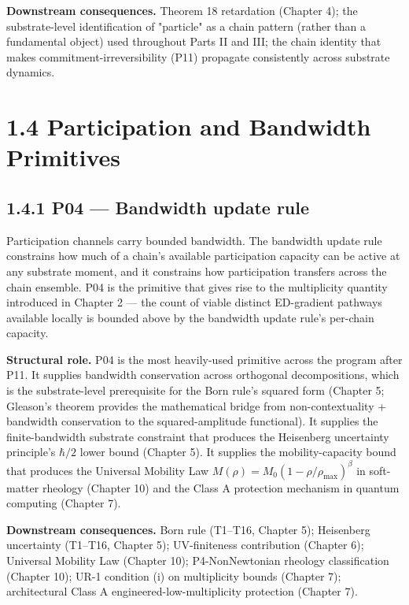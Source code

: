 \documentclass[11pt]{book}
\begin{document}
\textbf{Downstream consequences.} Theorem 18 retardation (Chapter 4); the substrate-level identification of "particle" as a chain pattern (rather than a fundamental object) used throughout Parts II and III; the chain identity that makes commitment-irreversibility (P11) propagate consistently across substrate dynamics.

\section{1.4 Participation and Bandwidth Primitives}

\subsection{1.4.1 P04 — Bandwidth update rule}

Participation channels carry bounded bandwidth. The bandwidth update rule constrains how much of a chain's available participation capacity can be active at any substrate moment, and it constrains how participation transfers across the chain ensemble. P04 is the primitive that gives rise to the multiplicity quantity introduced in Chapter 2 — the count of viable distinct ED-gradient pathways available locally is bounded above by the bandwidth update rule's per-chain capacity.

\textbf{Structural role.} P04 is the most heavily-used primitive across the program after P11. It supplies bandwidth conservation across orthogonal decompositions, which is the substrate-level prerequisite for the Born rule's squared form (Chapter 5; Gleason's theorem provides the mathematical bridge from non-contextuality + bandwidth conservation to the squared-amplitude functional). It supplies the finite-bandwidth substrate constraint that produces the Heisenberg uncertainty principle's $\hbar/2$ lower bound (Chapter 5). It supplies the mobility-capacity bound that produces the Universal Mobility Law $M(\rho) = M_0(1 - \rho/\rho_\mathrm{max})^\beta$ in soft-matter rheology (Chapter 10) and the Class A protection mechanism in quantum computing (Chapter 7).

\textbf{Downstream consequences.} Born rule (T1–T16, Chapter 5); Heisenberg uncertainty (T1–T16, Chapter 5); UV-finiteness contribution (Chapter 6); Universal Mobility Law (Chapter 10); P4-NonNewtonian rheology classification (Chapter 10); UR-1 condition (i) on multiplicity bounds (Chapter 7); architectural Class A engineered-low-multiplicity protection (Chapter 7).
\end{document}
